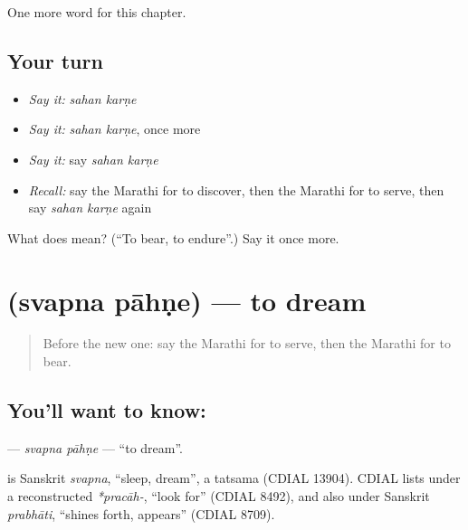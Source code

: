 \begin{grammarlens}[title={What you've built}]
One more word for this chapter.
\end{grammarlens}

\subsection*{Your turn}
\begin{itemize}
\raggedright
  \item \emph{Say it:} \emph{sahan karṇe}
  \item \emph{Say it:} \emph{sahan karṇe}, once more
  \item \emph{Say it:} say \emph{sahan karṇe}
  \item \emph{Recall:} say the Marathi for to discover, then the Marathi for to serve, then say \emph{sahan karṇe} again
\end{itemize}

\begin{tcolorbox}[breakable,colback=teal!4,colframe=teal!35!black,title={Before you move on}]
What does   mean? (\textquotedblleft{}To bear, to endure\textquotedblright{}.) Say it once more.
\end{tcolorbox}
\section[\texorpdfstring{\mr{स्वप्न} \mr{पाहणे} (svapna pāhṇe)}{स्वप्न पाहणे (svapna pāhṇe)}]{  (svapna pāhṇe) — to dream}

\label{lesson:MR-C254-svapna-pahne}



\begin{quote}
Before the new one: say the Marathi for to serve, then the Marathi for to bear.
\end{quote}

\subsection*{You'll want to know:  }
\textbf{ } — \emph{svapna pāhṇe} — \textquotedblleft{}to dream\textquotedblright{}.

\begin{cousinweb}
\textbf{} is Sanskrit \emph{svapna}, \textquotedblleft{}sleep, dream\textquotedblright{}, a tatsama (CDIAL 13904). CDIAL lists \textbf{} under a reconstructed \emph{*pracāh-}, \textquotedblleft{}look for\textquotedblright{} (CDIAL 8492), and also under Sanskrit \emph{prabhāti}, \textquotedblleft{}shines forth, appears\textquotedblright{} (CDIAL 8709).
\end{cousinweb}

